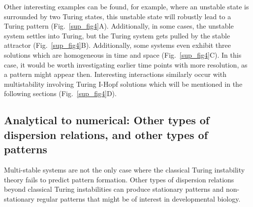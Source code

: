 Other interesting examples can be found, for example, where an unstable state is surrounded by two Turing states, this unstable state will robustly lead to a Turing pattern (Fig.~\ref{sup_fig4}A).
Additionally, in some cases, the unstable system settles into Turing, but the Turing system gets pulled by the stable attractor (Fig.~\ref{sup_fig4}B). Additionally, some systems even exhibit three solutions which are homogeneous in time and space (Fig.~\ref{sup_fig4}C).
In this case, it would be worth investigating earlier time points with more resolution, as a pattern might appear then.
Interesting interactions similarly occur with multistability involving Turing I-Hopf solutions which will be mentioned in the following sections (Fig.~\ref{sup_fig4}D).



\subsection{Analytical to numerical: Other types of dispersion relations, and other types of patterns} \label{nogrowth}
Multi-stable systems are not the only case where the classical Turing instability theory fails to predict pattern formation.
Other types of dispersion relations beyond classical Turing instabilities can produce stationary patterns and non-stationary regular patterns that might be of interest in developmental biology.

